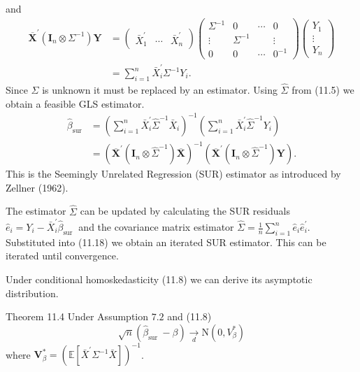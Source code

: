 \documentclass[10pt]{article}
\begin{document}
and
$$
\begin{aligned}
\overline{\boldsymbol{X}}^{\prime}\left(\boldsymbol{I}_{n} \otimes \Sigma^{-1}\right) \boldsymbol{Y} &=\left(\begin{array}{lll}
\bar{X}_{1}^{\prime} & \cdots & \bar{X}_{n}^{\prime}
\end{array}\right)\left(\begin{array}{cccc}
\Sigma^{-1} & 0 & \cdots & 0 \\
\vdots & \Sigma^{-1} & & \vdots \\
0 & 0 & \cdots & 0^{-1}
\end{array}\right)\left(\begin{array}{c}
Y_{1} \\
\vdots \\
Y_{n}
\end{array}\right) \\
&=\sum_{i=1}^{n} \bar{X}_{i}^{\prime} \Sigma^{-1} Y_{i} .
\end{aligned}
$$
Since $\Sigma$ is unknown it must be replaced by an estimator. Using $\widehat{\Sigma}$ from (11.5) we obtain a feasible GLS estimator.
$$
\begin{aligned}
\widehat{\beta}_{\mathrm{sur}} &=\left(\sum_{i=1}^{n} \bar{X}_{i}^{\prime} \widehat{\Sigma}^{-1} \bar{X}_{i}\right)^{-1}\left(\sum_{i=1}^{n} \bar{X}_{i}^{\prime} \widehat{\Sigma}^{-1} Y_{i}\right) \\
&=\left(\overline{\boldsymbol{X}}^{\prime}\left(\boldsymbol{I}_{n} \otimes \widehat{\Sigma}^{-1}\right) \overline{\boldsymbol{X}}\right)^{-1}\left(\overline{\boldsymbol{X}}^{\prime}\left(\boldsymbol{I}_{n} \otimes \widehat{\Sigma}^{-1}\right) \boldsymbol{Y}\right) .
\end{aligned}
$$
This is the Seemingly Unrelated Regression (SUR) estimator as introduced by Zellner (1962).

The estimator $\widehat{\Sigma}$ can be updated by calculating the SUR residuals $\widehat{e}_{i}=Y_{i}-\bar{X}_{i}^{\prime} \widehat{\beta}_{\text {sur }}$ and the covariance matrix estimator $\widehat{\Sigma}=\frac{1}{n} \sum_{i=1}^{n} \widehat{e}_{i} \widehat{e}_{i}^{\prime}$. Substituted into (11.18) we obtain an iterated SUR estimator. This can be iterated until convergence.

Under conditional homoskedasticity (11.8) we can derive its asymptotic distribution.

Theorem 11.4 Under Assumption $7.2$ and (11.8)
$$
\sqrt{n}\left(\widehat{\beta}_{\text {sur }}-\beta\right) \underset{d}{\longrightarrow} \mathrm{N}\left(0, V_{\beta}^{*}\right)
$$
where $\boldsymbol{V}_{\beta}^{*}=\left(\mathbb{E}\left[\bar{X}^{\prime} \Sigma^{-1} \bar{X}\right]\right)^{-1}$.
\end{document}
